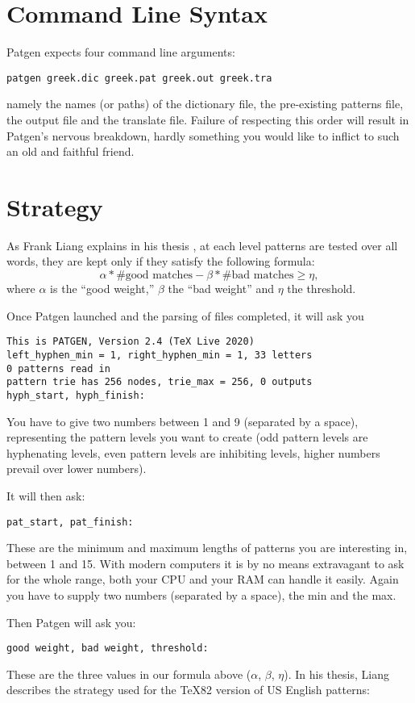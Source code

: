 \documentclass{article}
\begin{document}
\section{Command Line Syntax}

Patgen expects four command line arguments:
\begin{verbatim}
patgen greek.dic greek.pat greek.out greek.tra
\end{verbatim}
namely the names (or paths) of the dictionary file, the pre-existing patterns file, the output file and the translate file. Failure of respecting this order will result in Patgen's nervous breakdown, hardly something you would like to inflict to such an old and faithful friend.

\section{Strategy} As Frank Liang explains in his thesis \cite[p.~37]{liang}, at each level patterns are tested over all words, they are kept only if they satisfy the following formula:
$$
\alpha*\text{\#good matches}-\beta*\text{\#bad matches}\geq\eta,
$$
where $\alpha$ is the ``good weight,'' $\beta$ the ``bad weight'' and $\eta$ the threshold.

Once Patgen launched and the parsing of files completed, it will ask you
\begin{verbatim}
This is PATGEN, Version 2.4 (TeX Live 2020)
left_hyphen_min = 1, right_hyphen_min = 1, 33 letters
0 patterns read in
pattern trie has 256 nodes, trie_max = 256, 0 outputs
hyph_start, hyph_finish: 
\end{verbatim}
You have to give two numbers between 1 and 9 (separated by a space), representing the pattern levels you want to create (odd pattern levels are hyphenating levels, even pattern levels are inhibiting levels, higher numbers prevail over lower numbers).

It will then ask:
\begin{verbatim}
pat_start, pat_finish:
\end{verbatim}
These are the minimum and maximum lengths of patterns you are interesting in, between 1 and 15. With modern computers it is by no means extravagant to ask for the whole range, both your CPU and your RAM can handle it easily. Again you have to supply two numbers (separated by a space), the min and the max.

Then Patgen will ask you:
\begin{verbatim}
good weight, bad weight, threshold: 
\end{verbatim}
These are the three values in our formula above ($\alpha$, $\beta$, $\eta$). In his thesis, Liang describes the strategy used for the \TeX82 version of US English patterns:
\end{document}
